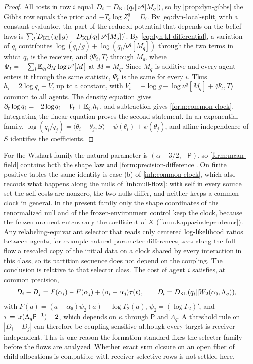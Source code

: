 \begin{proof}
All costs in row $i$ equal $D_i=D_{\mathrm{KL}}(q_i\Vert\nu^q[M_q])$, so by \cref{prop:dyn-gibbs} the Gibbs row equals the prior and $-T_q\log Z^q_i=D_i$. By \cref{eq:dyn-local-split} with a constant evaluator, the part of the reduced potential that depends on the belief laws is $\sum_l[D_{\mathrm{KL}}(q_l\Vert g)+D_{\mathrm{KL}}(q_l\Vert\nu^q[M_q])]$. By \cref{eq:dyn-kl-differential}, a variation of $q_i$ contributes $\log(q_i/g)+\log(q_i/\nu^q[M_q])$ through the two terms in which $q_i$ is the receiver, and $\langle\Psi_t,T\rangle$ through $M_q$, where $\Psi_t=-\sum_l\mathbb E_{q_l}\partial_M\log\nu^q[M]$ at $M=M_q$. Since $M_q$ is additive and every agent enters it through the same statistic, $\Psi_t$ is the same for every $i$. Thus $h_i=2\log q_i+V_t$ up to a constant, with $V_t=-\log g-\log\nu^q[M_q]+\langle\Psi_t,T\rangle$ common to all agents. The density equation gives $\partial_t\log q_i=-2\log q_i-V_t+\mathbb E_{q_i}h_i$, and subtraction gives \cref{form:common-clock}. Integrating the linear equation proves the second statement. In an exponential family, $\log(q_i/q_j)=\langle\theta_i-\theta_j,S\rangle-\psi(\theta_i)+\psi(\theta_j)$, and affine independence of $S$ identifies the coefficients.
\end{proof}

For the Wishart family the natural parameter is $(\alpha-3/2,-\mathsf P)$, so \cref{form:mean-field} contains both the shape law and \cref{form:precision-difference}. On finite positive tables the same identity is case (b) of \cref{inh:common-clock}, which also records what happens along the nulls of \cref{inh:null-flow}: with self in every source set the self costs are nonzero, the two nulls differ, and neither keeps a common clock in general. In the present family only the shape coordinates of the renormalized null and of the frozen-environment control keep the clock, because the frozen moment enters only the coefficient of $X$ (\cref{form:kappa-independence}). Any relabeling-equivariant selector that reads only centered log-likelihood ratios between agents, for example natural-parameter differences, sees along the full flow a rescaled copy of the initial data on a clock shared by every interaction in this class, so its partition sequence does not depend on the coupling. The conclusion is relative to that selector class. The cost of agent $i$ satisfies, at common precision,
\begin{equation}
 D_i-D_j=F(\alpha_i)-F(\alpha_j)+(\alpha_i-\alpha_j)\tau(t),\qquad D_i=D_{\mathrm{KL}}(q_i\Vert W_2(\alpha_0,\Lambda_q)),
 \label{form:cost-difference}
\end{equation}
with $F(a)=(a-\alpha_0)\psi_2(a)-\log\Gamma_2(a)$, $\psi_2=(\log\Gamma_2)'$, and $\tau=\operatorname{tr}(\Lambda_q\mathsf P^{-1})-2$, which depends on $\kappa$ through $\mathsf P$ and $\Lambda_q$. A threshold rule on $|D_i-D_j|$ can therefore be coupling sensitive although every target is receiver independent. This is one reason the formation standard fixes the selector family before the flows are analyzed. Whether exact sum closure on an open fiber of child allocations is compatible with receiver-selective rows is not settled here.

